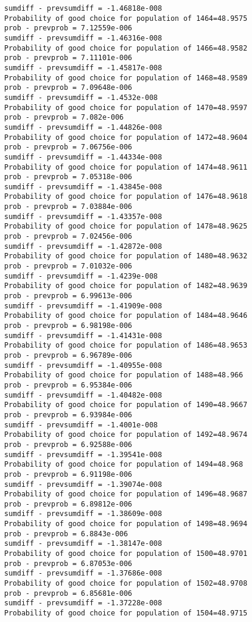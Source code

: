 \documentclass[11pt,onecolumn]{article}
\begin{document}
\begin{verbatim}
sumdiff - prevsumdiff = -1.46818e-008
Probability of good choice for population of 1464=48.9575
prob - prevprob = 7.12559e-006
sumdiff - prevsumdiff = -1.46316e-008
Probability of good choice for population of 1466=48.9582
prob - prevprob = 7.11101e-006
sumdiff - prevsumdiff = -1.45817e-008
Probability of good choice for population of 1468=48.9589
prob - prevprob = 7.09648e-006
sumdiff - prevsumdiff = -1.4532e-008
Probability of good choice for population of 1470=48.9597
prob - prevprob = 7.082e-006
sumdiff - prevsumdiff = -1.44826e-008
Probability of good choice for population of 1472=48.9604
prob - prevprob = 7.06756e-006
sumdiff - prevsumdiff = -1.44334e-008
Probability of good choice for population of 1474=48.9611
prob - prevprob = 7.05318e-006
sumdiff - prevsumdiff = -1.43845e-008
Probability of good choice for population of 1476=48.9618
prob - prevprob = 7.03884e-006
sumdiff - prevsumdiff = -1.43357e-008
Probability of good choice for population of 1478=48.9625
prob - prevprob = 7.02456e-006
sumdiff - prevsumdiff = -1.42872e-008
Probability of good choice for population of 1480=48.9632
prob - prevprob = 7.01032e-006
sumdiff - prevsumdiff = -1.4239e-008
Probability of good choice for population of 1482=48.9639
prob - prevprob = 6.99613e-006
sumdiff - prevsumdiff = -1.41909e-008
Probability of good choice for population of 1484=48.9646
prob - prevprob = 6.98198e-006
sumdiff - prevsumdiff = -1.41431e-008
Probability of good choice for population of 1486=48.9653
prob - prevprob = 6.96789e-006
sumdiff - prevsumdiff = -1.40955e-008
Probability of good choice for population of 1488=48.966
prob - prevprob = 6.95384e-006
sumdiff - prevsumdiff = -1.40482e-008
Probability of good choice for population of 1490=48.9667
prob - prevprob = 6.93984e-006
sumdiff - prevsumdiff = -1.4001e-008
Probability of good choice for population of 1492=48.9674
prob - prevprob = 6.92588e-006
sumdiff - prevsumdiff = -1.39541e-008
Probability of good choice for population of 1494=48.968
prob - prevprob = 6.91198e-006
sumdiff - prevsumdiff = -1.39074e-008
Probability of good choice for population of 1496=48.9687
prob - prevprob = 6.89812e-006
sumdiff - prevsumdiff = -1.38609e-008
Probability of good choice for population of 1498=48.9694
prob - prevprob = 6.8843e-006
sumdiff - prevsumdiff = -1.38147e-008
Probability of good choice for population of 1500=48.9701
prob - prevprob = 6.87053e-006
sumdiff - prevsumdiff = -1.37686e-008
Probability of good choice for population of 1502=48.9708
prob - prevprob = 6.85681e-006
sumdiff - prevsumdiff = -1.37228e-008
Probability of good choice for population of 1504=48.9715

\end{verbatim}
\end{document}
